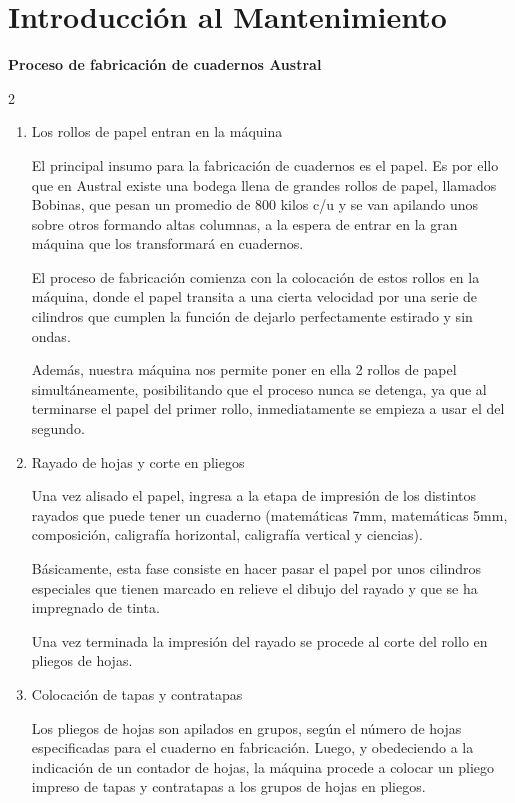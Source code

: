 
\section{Introducción al Mantenimiento}
\textbf{Proceso de fabricación de cuadernos Austral}
\begin{multicols}{2}
\begin{enumerate}
\large
\item Los rollos de papel entran en la máquina

El  principal insumo para la fabricación de cuadernos es el papel. Es por ello que en Austral existe una bodega llena de grandes rollos de papel, llamados Bobinas, que pesan un promedio de 800 kilos c/u y se van apilando unos sobre otros formando altas columnas, a la espera de entrar en la gran máquina que los transformará en cuadernos.

El proceso de fabricación comienza con la colocación de estos rollos en la máquina, donde el papel transita a una cierta velocidad por una serie de cilindros que cumplen la función de dejarlo perfectamente estirado y sin ondas.

Además, nuestra máquina nos permite poner en ella 2 rollos de papel simultáneamente, posibilitando que el proceso nunca se detenga, ya que al terminarse el papel del primer rollo, inmediatamente se empieza a usar el del segundo.

\item Rayado de hojas y corte en pliegos

Una vez alisado el papel, ingresa a la etapa de impresión de los distintos rayados que puede tener un cuaderno (matemáticas 7mm, matemáticas 5mm, composición, caligrafía horizontal, caligrafía vertical y ciencias).

Básicamente, esta fase consiste en hacer pasar el papel por unos cilindros especiales que tienen marcado en relieve el dibujo del rayado y que se ha impregnado de tinta.

Una vez terminada la impresión del rayado se procede al corte del rollo en pliegos de hojas.

\item Colocación de tapas y contratapas

Los pliegos de hojas son apilados en grupos, según el número de hojas especificadas para el cuaderno en fabricación. Luego, y obedeciendo a la indicación de un contador de hojas, la máquina procede a colocar un pliego impreso de tapas y contratapas a los grupos de hojas en pliegos.


\end{enumerate}
\end{multicols}
